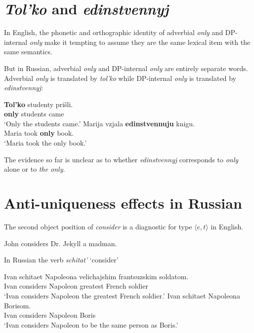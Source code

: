 \documentclass{article}
\begin{document}
\section{\textit{Tol'ko} and \textit{edinstvennyj}}
In English, the phonetic and orthographic identity of adverbial \textit{only} and DP-internal \textit{only} make it tempting to assume they are the same lexical item with the same semantics.

But in Russian, adverbial \textit{only} and DP-internal \textit{only} are entirely separate words. Adverbial \textit{only} is translated by \textit{tol'ko} while DP-internal \textit{only} is translated by \textit{edinstvennyj}:

\begin{exe}
	\ex \gll \textbf{Tol'ko} studenty pri\v{s}li.\\
	\textbf{only} students came\\
	\glt `Only the students came.'
	\ex \gll Marija vzjala \textbf{edinstvennuju} knigu.\\
	Maria took \textbf{only} book.\\
	\glt `Maria took the only book.'
\end{exe}

The evidence so far is unclear as to whether \textit{edinstvennyj} corresponds to \textit{only} alone or to \textit{the only}.


\section{Anti-uniqueness effects in Russian}

The second object position of \textit{consider} is a diagnostic for type $\langle e, t \rangle$ in English.

\begin{exe}
	\ex John considers Dr. Jekyll a madman.
\end{exe}

In Russian the verb \textit{schitat'} `consider'

\begin{exe}
	\ex \gll Ivan schitaet Napoleona velichajshim frantsuzskim soldatom.\\
	Ivan considers Napoleon greatest French soldier\\
	`Ivan considers Napoleon the greatest French soldier.'
	\ex \gll Ivan schitaet Napoleona Borisom.\\
	Ivan considers Napoleon Boris\\
	`Ivan considers Napoleon to be the same person as Boris.'
\end{exe}
\end{document}
